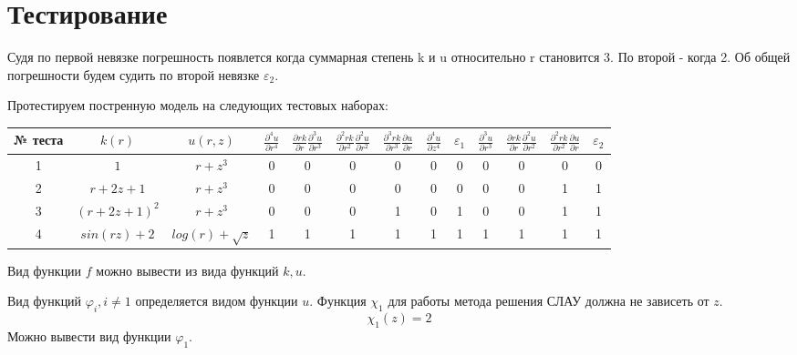 \section{Тестирование}

Судя по первой невязке погрешность появлется когда суммарная степень k и u относительно r становится 3. По второй - когда 2. Об общей погрешности будем судить по второй невязке $\varepsilon_2$.

Протестируем постренную модель на следующих тестовых наборах:
\begin{center}
  \begin{tabular}{c|c c|c c c c c|c|c c c|c}
  \toprule
  № теста & $k(r)$ & $u(r, z)$ & $\frac{\partial^4 u}{\partial r^4}$ & $\frac{\partial r k}{\partial r}\frac{\partial^3 u}{\partial r^3}$ & $\frac{\partial^2 r k}{\partial r^2}\frac{\partial^2 u}{\partial r^2}$ & $\frac{\partial^3 r k}{\partial r^3}\frac{\partial u}{\partial r}$ & $\frac{\partial^4 u}{\partial z^4}$ & $\varepsilon_1$ & $\frac{\partial^3 u}{ \partial r^3}$ & $\frac{\partial rk}{ \partial r} \frac{\partial^2 u}{ \partial r^2}$ & $\frac{\partial^2 rk}{ \partial r^2} \frac{\partial u}{ \partial r}$ & $\varepsilon_2$ \\
  \midrule
  1 & $ 1 $ & $r + z^3$ & 0 & 0 & 0 & 0 & 0 & 0 & 0 & 0 & 0 & 0 \\
  2 & $ r + 2z + 1 $ & $r + z^3$ & 0 & 0 & 0 & 0 & 0 & 0 & 0 & 0 & 1 & 1 \\
  3 & $ (r + 2z + 1)^2 $ & $r + z^3$ & 0 & 0 & 0 & 1 & 0 & 1 & 0 & 0 & 1 & 1 \\
  4 & $ sin(rz) + 2 $ & $log(r) + \sqrt{z}$ & 1 & 1 & 1 & 1 & 1 & 1 & 1 & 1 & 1 & 1 \\
  \bottomrule
  \end{tabular}
\end{center}

Вид функции $f$ можно вывести из вида функций $k,u$.

Вид функций $\varphi_i, i\neq1$ определяется видом функции $u$. Функция $\chi_1$ для работы метода решения СЛАУ должна не зависеть от $z$.
\[\chi_1(z) = 2\]
Можно вывести вид функции $\varphi_1$.

